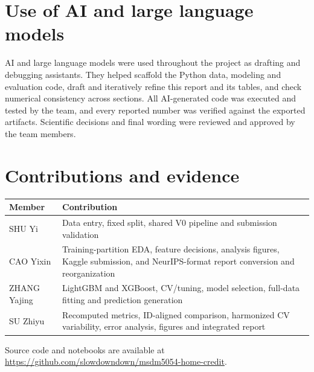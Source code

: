 \documentclass{article}
\begin{document}
\section{Use of AI and large language models}
AI and large language models were used throughout the project as drafting and debugging assistants. They helped scaffold the Python data, modeling and evaluation code, draft and iteratively refine this report and its tables, and check numerical consistency across sections. All AI-generated code was executed and tested by the team, and every reported number was verified against the exported artifacts. Scientific decisions and final wording were reviewed and approved by the team members.

\section{Contributions and evidence}
\begin{table}[ht]
\centering
\small
\begin{tabularx}{\columnwidth}{@{}l>{\raggedright\arraybackslash}X@{}}
\toprule
Member & Contribution \\
\midrule
SHU Yi & Data entry, fixed split, shared V0 pipeline and submission validation \\
CAO Yixin & Training-partition EDA, feature decisions, analysis figures, Kaggle submission, and NeurIPS-format report conversion and reorganization \\
ZHANG Yajing & LightGBM and XGBoost, CV/tuning, model selection, full-data fitting and prediction generation \\
SU Zhiyu & Recomputed metrics, ID-aligned comparison, harmonized CV variability, error analysis, figures and integrated report \\
\bottomrule
\end{tabularx}
\end{table}

Source code and notebooks are available at \url{https://github.com/slowdowndown/msdm5054-home-credit}.
\end{document}
